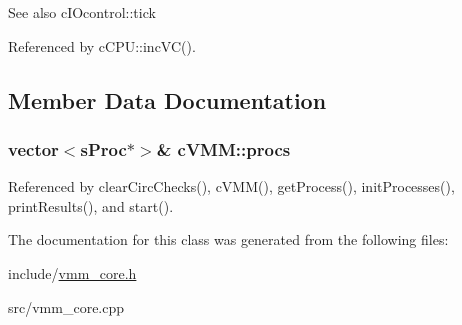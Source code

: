 \begin{DoxySeeAlso}{\-See also}
c\-I\-Ocontrol\-::tick 
\end{DoxySeeAlso}


\-Referenced by c\-C\-P\-U\-::inc\-V\-C().



\subsection{\-Member \-Data \-Documentation}
\hypertarget{classcVMM_aff53240e056433014fa0a9f7ab71cf26}{
\subsubsection[{procs}]{\setlength{\rightskip}{0pt plus 5cm}vector$<${\bf s\-Proc}$\ast$$>$\& {\bf c\-V\-M\-M\-::procs}}}\label{dc/de5/classcVMM_aff53240e056433014fa0a9f7ab71cf26}


\-Referenced by clear\-Circ\-Checks(), c\-V\-M\-M(), get\-Process(), init\-Processes(), print\-Results(), and start().



\-The documentation for this class was generated from the following files\-:\begin{DoxyCompactItemize}
\item 
include/\hyperlink{vmm__core_8h}{vmm\-\_\-core.\-h}\item 
src/vmm\-\_\-core.\-cpp\end{DoxyCompactItemize}
